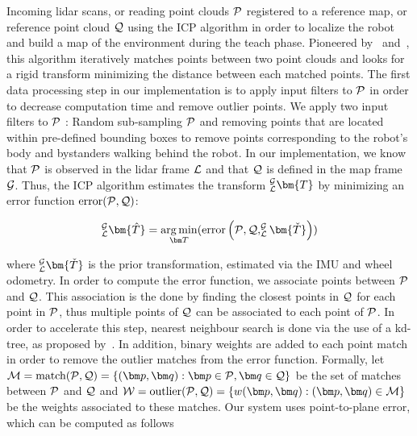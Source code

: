 Incoming lidar scans, or reading point clouds $\mathcal{P}$ registered to a reference map, or reference point cloud $\mathcal{Q}$ using the \ac{ICP} algorithm in order to localize the robot and build a map of the environment during the teach phase.
Pioneered by~\citet{Besl1992} and~\citet{Chen1991}, this algorithm iteratively matches points between two point clouds and looks for a rigid transform minimizing the distance between each matched points.
The first data processing step in our implementation is to apply input filters to $\mathcal{P}$ in order to decrease computation time and remove outlier points.
We apply two input filters to $\mathcal{P}$ : Random sub-sampling $\mathcal{P}$ and removing points that are located within pre-defined bounding boxes to remove points corresponding to the robot's body and bystanders walking behind the robot.
In our implementation, we know that $\mathcal{P}$ is observed in the lidar frame $\mathcal{L}$ and that $\mathcal{Q}$ is defined in the map frame $\mathcal{G}$.
Thus, the \ac{ICP} algorithm estimates the transform $_{\lidarf}^{\mapf}\bm{T}$ by minimizing an error function $\text{error}(\mathcal{P}, \mathcal{Q})$:

\begin{equation}
	_{\lidarf}^{\mapf}\bm{\hat{T}} = \argmin_{\bm T} (\text{error} \left(\readpc, \refpc, _{\lidarf}^{\mapf}\bm{\check{T}} \right))
\end{equation}

where $_{\lidarf}^{\mapf}\bm{\check{T}}$ is the prior transformation, estimated via the \ac{IMU} and wheel odometry.
In order to compute the error function, we associate points between $\mathcal{P}$ and $\mathcal{Q}$.
This association is the done by finding the closest points in $\mathcal{Q}$ for each point in $\mathcal{P}$, thus multiple points of $\mathcal{Q}$ can be associated to each point of $\mathcal{P}$.
In order to accelerate this step, nearest neighbour search is done via the use of a kd-tree, as proposed by~\citet{Elseberg2012}.
In addition, binary weights are added to each point match in order to remove the outlier matches from the error function.
Formally, let $\match = \text{match}(\readpc, \refpc) = \{(\bm p, \bm q) : \bm p \in \readpc, \bm q \in \refpc \}$ be the set of matches between $\mathcal{P}$ and $\mathcal{Q}$ and $\weight = \text{outlier}(\readpc, \refpc) = \{w(\bm p, \bm q) : (\bm p, \bm q) \in \match\}$ be the weights associated to these matches.
Our system uses point-to-plane error, which can be computed as follows

